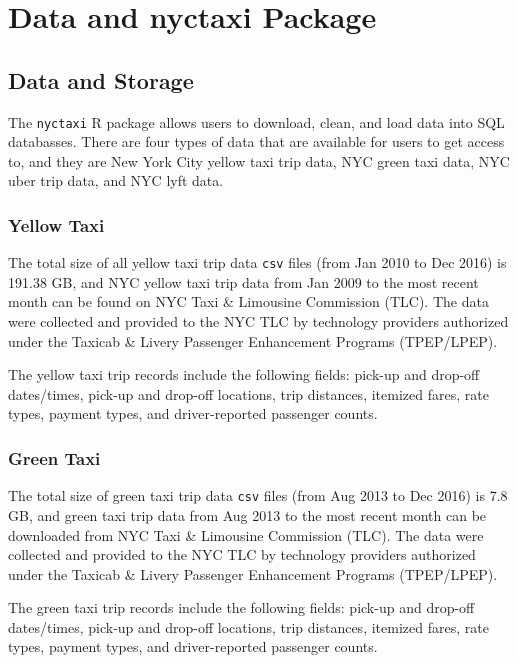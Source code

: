 \documentclass[12pt,twoside]{reedthesis}
\theoremstyle{definition}
\theoremstyle{definition}
\theoremstyle{definition}
\theoremstyle{remark}
\begin{document}
\chapter{Data and nyctaxi Package}\label{chapter2}

\section{Data and Storage}\label{data-and-storage}

The \texttt{nyctaxi} R package allows users to download, clean, and load
data into SQL databasses. There are four types of data that are
available for users to get access to, and they are New York City yellow
taxi trip data, NYC green taxi data, NYC uber trip data, and NYC lyft
data.

\subsection{Yellow Taxi}\label{yellow-taxi-1}

The total size of all yellow taxi trip data \texttt{csv} files (from Jan
2010 to Dec 2016) is 191.38 GB, and NYC yellow taxi trip data from Jan
2009 to the most recent month can be found on NYC Taxi \& Limousine
Commission (TLC). The data were collected and provided to the NYC TLC by
technology providers authorized under the Taxicab \& Livery Passenger
Enhancement Programs (TPEP/LPEP).

The yellow taxi trip records include the following fields: pick-up and
drop-off dates/times, pick-up and drop-off locations, trip distances,
itemized fares, rate types, payment types, and driver-reported passenger
counts.

\subsection{Green Taxi}\label{green-taxi-1}

The total size of green taxi trip data \texttt{csv} files (from Aug 2013
to Dec 2016) is 7.8 GB, and green taxi trip data from Aug 2013 to the
most recent month can be downloaded from NYC Taxi \& Limousine
Commission (TLC). The data were collected and provided to the NYC TLC by
technology providers authorized under the Taxicab \& Livery Passenger
Enhancement Programs (TPEP/LPEP).

The green taxi trip records include the following fields: pick-up and
drop-off dates/times, pick-up and drop-off locations, trip distances,
itemized fares, rate types, payment types, and driver-reported passenger
counts.
\end{document}
